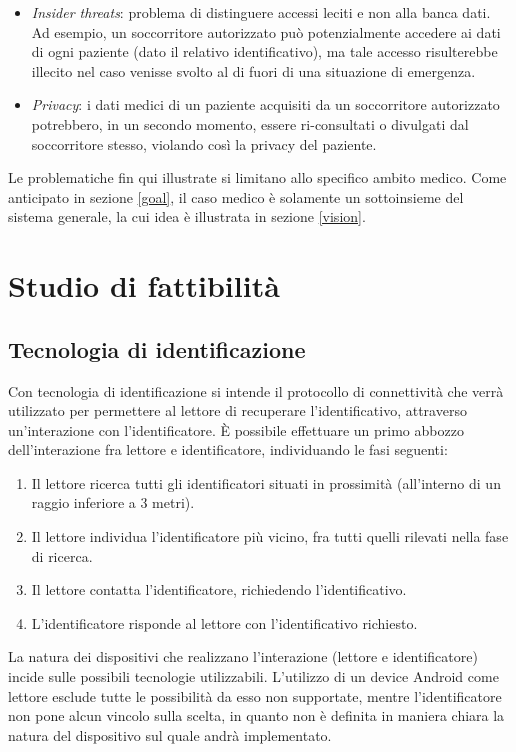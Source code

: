 \documentclass[a4paper,12pt]{report}
\begin{document}
\begin{description}
\begin{itemize}
		\item \emph{Insider threats}: problema di distinguere accessi leciti e non alla banca dati. Ad esempio, un soccorritore autorizzato può potenzialmente accedere ai dati di ogni paziente (dato il relativo identificativo), ma tale accesso risulterebbe illecito nel caso venisse svolto al di fuori di una situazione di emergenza.
		\item \emph{Privacy}: i dati medici di un paziente acquisiti da un soccorritore autorizzato potrebbero, in un secondo momento, essere ri-consultati o divulgati dal soccorritore stesso, violando così la privacy del paziente.
	\end{itemize} 
\end{description}
Le problematiche fin qui illustrate si limitano allo specifico ambito medico. Come anticipato in sezione \ref{goal}, il caso medico è solamente un sottoinsieme del sistema generale, la cui idea è illustrata in sezione \ref{vision}. 

\section{Studio di fattibilità}
\subsection{Tecnologia di identificazione}
Con tecnologia di identificazione si intende il protocollo di connettività che verrà utilizzato per permettere al lettore di recuperare l'identificativo, attraverso un'interazione con l'identificatore. È possibile effettuare un primo abbozzo dell'interazione fra lettore e identificatore, individuando le fasi seguenti:
\begin{enumerate}
	\item Il lettore ricerca tutti gli identificatori situati in prossimità (all'interno di un raggio inferiore a 3 metri).
	\item Il lettore individua l'identificatore più vicino, fra tutti quelli rilevati nella fase di ricerca.
	\item Il lettore contatta l'identificatore, richiedendo l'identificativo.
	\item L'identificatore risponde al lettore con l'identificativo richiesto.
\end{enumerate}
La natura dei dispositivi che realizzano l'interazione (lettore e identificatore) incide sulle possibili tecnologie utilizzabili. L'utilizzo di un device Android come lettore esclude tutte le possibilità da esso non supportate, mentre l'identificatore non pone alcun vincolo sulla scelta, in quanto non è definita in maniera chiara la natura del dispositivo sul quale andrà implementato.
\end{document}
